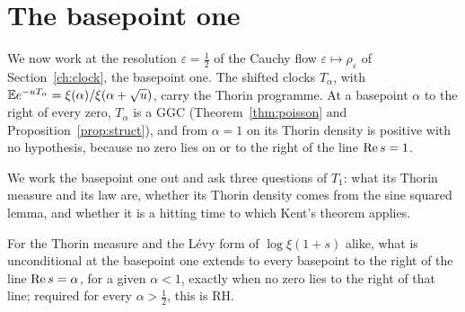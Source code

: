 \chapter{The basepoint one}\label{chap:basepoint}

We now work at the resolution $\varepsilon=\frac12$ of the Cauchy flow $\varepsilon\mapsto\rho_\varepsilon$ of Section~\ref{ch:clock}, the basepoint one. The shifted clocks $T_\alpha$, with $\mathbb{E} e^{-uT_\alpha}=\xi(\alpha)/\xi(\alpha+\sqrt u)$, carry the Thorin programme. At a basepoint $\alpha$ to the right of every zero, $T_\alpha$ is a GGC (Theorem~\ref{thm:poisson} and Proposition~\ref{prop:struct}), and from $\alpha=1$ on its Thorin density is positive with no hypothesis, because no zero lies on or to the right of the line $\operatorname{Re} s=1$.

We work the basepoint one out and ask three questions of $T_1$: what its Thorin measure and its law are, whether its Thorin density comes from the sine squared lemma, and whether it is a hitting time to which Kent's theorem applies.

For the Thorin measure and the L\'evy form of $\log\xi(1+s)$ alike, what is unconditional at the basepoint one extends to every basepoint to the right of the line $\operatorname{Re} s=\alpha$, for a given $\alpha<1$, exactly when no zero lies to the right of that line; required for every $\alpha>\frac12$, this is RH.
